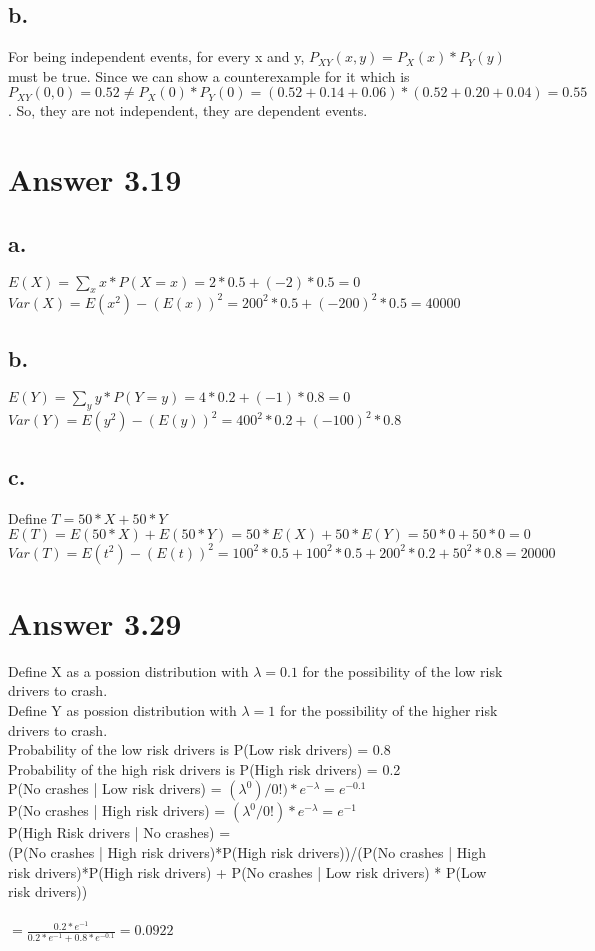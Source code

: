 \documentclass[12pt]{article}
\begin{document}
\subsection*{b.}
For being independent events, for every x and y, $P_{XY}(x,y) = P_X(x) * P_Y(y)$ must be true. Since we can show a counterexample for it which is $P_{XY}(0,0) = 0.52 \neq P_X(0)* P_Y(0) = (0.52+0.14+0.06)*(0.52+0.20+0.04) = 0.55$. So, they are not independent, they are dependent events.



\section*{Answer 3.19}
\subsection*{a.}
$E(X) = \sum\limits_x x*P(X=x) = 2*0.5 + (-2)*0.5 = 0$ \\
$Var(X) = E(x^2) - (E(x))^2 = 200^2 * 0.5 + (-200)^2 * 0.5 = 40000$ \\
\subsection*{b.}
$E(Y) = \sum\limits_y y*P(Y=y) = 4*0.2 + (-1)*0.8 = 0$ \\
$Var(Y) = E(y^2) - (E(y))^2 = 400^2 * 0.2 + (-100)^2 * 0.8$ \\
\subsection*{c.}
Define $T = 50*X +50*Y$ \\
$E(T) = E(50*X) + E(50*Y) = 50*E(X) + 50*E(Y) = 50*0+50*0 = 0$ \\
$Var(T) = E(t^2) - (E(t))^2  = 100^2 * 0.5 + 100^2 * 0.5 + 200^2 * 0.2 + 50^2 *0.8 = 20000$
 

\section*{Answer 3.29}
Define X as a possion distribution with $\lambda = 0.1$ for the possibility of the low risk drivers to crash. \\
Define Y as possion distribution with $\lambda = 1$ for the possibility of the higher risk drivers to crash. \\
Probability of the low risk drivers is P(Low risk drivers) = 0.8 \\
Probability of the high risk drivers is P(High risk drivers) = 0.2 \\
P(No crashes | Low risk drivers) = $(\lambda^0)/0!)*e^{-\lambda} = e^{-0.1}$ \\
P(No crashes | High risk drivers) = $(\lambda^0/0!)*e^{-\lambda} = e^{-1}$ \\

P(High Risk drivers | No crashes) = \\(P(No crashes | High risk drivers)*P(High risk drivers))/(P(No crashes | High risk drivers)*P(High risk drivers) + P(No crashes | Low risk drivers) * P(Low risk drivers)) \\ \\

$ = \frac{0.2*e^{-1}}{0.2*e^{-1}+0.8*e^{-0.1}} = 0.0922$
\end{document}
